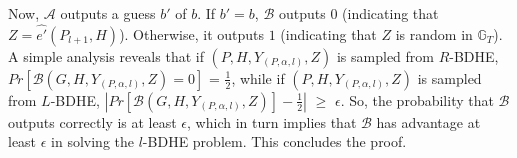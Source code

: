 Now, $\mathcal{A}$ outputs a guess $b'$ of $b$. If $b' = b$, $\mathcal{B}$ outputs $0$ (indicating that $Z = \hat{e'}(P_{l+1},H)$). Otherwise, it outputs $1$ (indicating that $Z$ is random in $\mathbb{G}_T$). A simple analysis reveals that if $(P,H,Y_{(P,\alpha,l)},Z)$ is sampled from $R$-BDHE, $Pr[\mathcal{B}(G,H,Y_{(P,\alpha,l)},Z)=0]$ = $\frac{1}{2}$, while if $(P,H,Y_{(P,\alpha,l)},Z)$ is sampled from $L$-BDHE, $|Pr[\mathcal{B}(G,H,Y_{(P,\alpha,l)},Z)]-\frac{1}{2}|$ $\geq$ $\epsilon$. So, the probability that $\mathcal{B}$ outputs correctly is at least $\epsilon$, which in turn implies that $\mathcal{B}$ has advantage at least $\epsilon$ in solving the $l$-BDHE problem. This concludes the proof.



